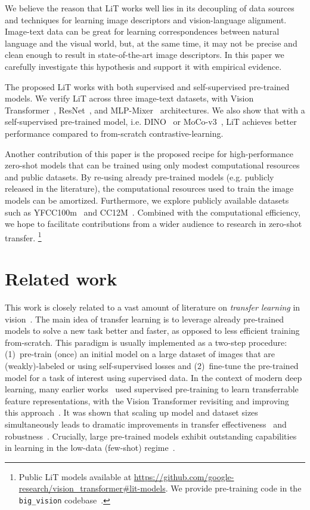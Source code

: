 \documentclass[10pt,twocolumn,letterpaper]{article}
\makeatletter
\def \lit {LiT\xspace}
\renewcommand*{\eg}{e.g.\@\xspace}
\renewcommand*{\ie}{i.e.\@\xspace}
\makeatother
\begin{document}
We believe the reason that \lit{} works well lies in its decoupling of data sources and techniques for learning image descriptors and vision-language alignment. Image-text data can be great for learning correspondences between natural language and the visual world, but, at the same time, it may not be precise and clean enough to result in state-of-the-art image descriptors. In this paper we carefully investigate this hypothesis and support it with empirical evidence.

The proposed \lit{} works with both supervised and self-supervised pre-trained models.
We verify \lit{} across three image-text datasets, with Vision Transformer~\cite{vit}, ResNet~\cite{bit}, and MLP-Mixer~\cite{mixer} architectures. 
We also show that with a self-supervised pre-trained model, \ie DINO~\cite{dino} or MoCo-v3~\cite{mocov3}, \lit{} achieves better performance compared to from-scratch contrastive-learning. 

Another contribution of this paper is the proposed recipe for high-performance zero-shot models that can be trained using only modest computational resources and public datasets.
By re-using already pre-trained models (\eg publicly released in the literature), the computational resources used to train the image models can be amortized.
Furthermore, we explore publicly available datasets such as YFCC100m~\cite{yfcc100m} and CC12M~\cite{cc12m}.
Combined with the computational efficiency, we hope to facilitate contributions from a wider audience to research in zero-shot transfer. \footnote{Public LiT models available at \url{https://github.com/google-research/vision_transformer\#lit-models}. We provide pre-training code in the {\tt big\_vision} codebase~\cite{big_vision}.}



\section{Related work}\label{sec:rw}

This work is closely related to a vast amount of literature on \textit{transfer learning} in vision~\cite{transfer_learning_survey,survey2018}.
The main idea of transfer learning is to leverage already pre-trained models to solve a new task better and faster, as opposed to less efficient training from-scratch. 
This paradigm is usually implemented as a two-step procedure: (1)~pre-train (once) an initial model on a large dataset of images that are (weakly)-labeled or using self-supervised losses and (2)~fine-tune the pre-trained model for a task of interest using supervised data.
In the context of modern deep learning, many earlier works~\cite{decaf,off-the-shelf,imagenet_transfer_better,bit} used supervised pre-training to learn transferrable feature representations, with the Vision Transformer revisiting and improving this approach~\cite{vit,vitg}.
It was shown that scaling up model and dataset sizes simultaneously leads to dramatic improvements in transfer effectiveness~\cite{bit,vit,vitg} and robustness~\cite{robustness_transferability_cnn}.
Crucially, large pre-trained models exhibit outstanding capabilities in learning in the low-data (few-shot) regime~\cite{bit,vit,ting_ss}.
\end{document}
